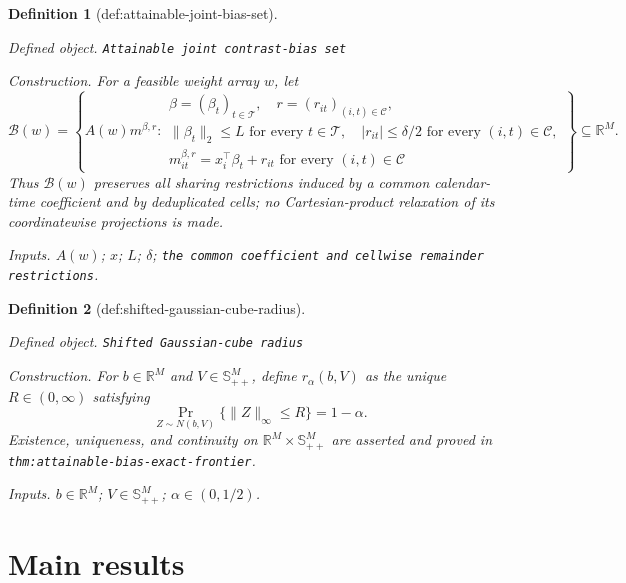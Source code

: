 \documentclass{article}
\newtheorem{definition}{Definition}
\begin{document}
\begin{definition}[def:attainable-joint-bias-set]\label{def:attainable-joint-bias-set}
\par\smallskip\noindent\emph{Defined object.} \texttt{Attainable joint contrast-\allowbreak{}bias set}
\par\smallskip\noindent\emph{Construction.} For a feasible weight array \(w\), let
\[
 \mathcal B(w)=\left\{A(w)m^{\beta,r}:
 \begin{array}{l}
 \beta=(\beta_t)_{t\in\mathcal T},\quad
 r=(r_{it})_{(i,t)\in\mathcal C},\\
 \lVert\beta_t\rVert_2\leq L\text{ for every }t\in\mathcal T,\quad
 |r_{it}|\leq\delta/2\text{ for every }(i,t)\in\mathcal C,\\
 m^{\beta,r}_{it}=x_i^{\top}\beta_t+r_{it}
 \text{ for every }(i,t)\in\mathcal C
 \end{array}\right\}\subseteq\mathbb R^M.
\]
Thus \(\mathcal B(w)\) preserves all sharing restrictions induced by a common
calendar-time coefficient and by deduplicated cells; no Cartesian-product
relaxation of its coordinatewise projections is made.
\par\smallskip\noindent\emph{Inputs.} \(A(w)\); \(x\); \(L\); \(\delta\); \texttt{the common coefficient and cellwise remainder restrictions}.
\end{definition}

\begin{definition}[def:shifted-gaussian-cube-radius]\label{def:shifted-gaussian-cube-radius}
\par\smallskip\noindent\emph{Defined object.} \texttt{Shifted Gaussian-\allowbreak{}cube radius}
\par\smallskip\noindent\emph{Construction.} For \(b\in\mathbb R^M\) and \(V\in\mathbb S_{++}^M\), define
\(r_\alpha(b,V)\) as the unique \(R\in(0,\infty)\) satisfying
\[
 \Pr_{Z\sim N(b,V)}\{\lVert Z\rVert_\infty\leq R\}=1-\alpha.
\]
Existence, uniqueness, and continuity on
\(\mathbb R^M\times\mathbb S_{++}^M\) are asserted and proved in
\texttt{thm:attainable-bias-exact-frontier}.
\par\smallskip\noindent\emph{Inputs.} \(b\in\mathbb R^M\); \(V\in\mathbb S_{++}^M\); \(\alpha\in(0,1/2)\).
\end{definition}

\section{Main results}
\end{document}
